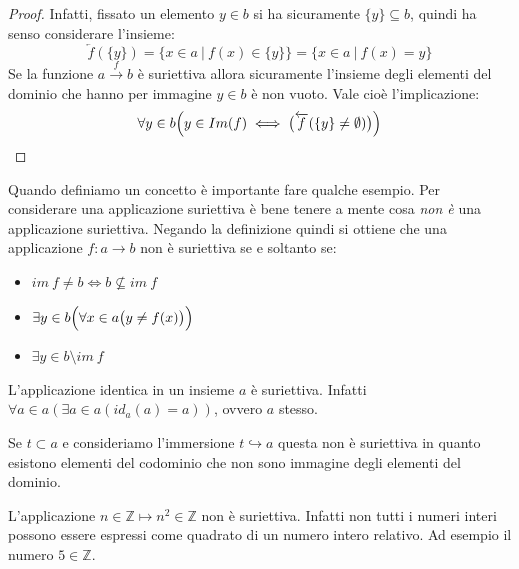 \begin{proof}
	Infatti, fissato un elemento $y \in b$ si ha sicuramente $\{y\} \subseteq b$, quindi ha senso considerare l'insieme:
	\begin{displaymath}
		\overleftarrow{f}(\{y\}) =\{x \in a \ | \ f(x) \in \{y\} \} = \{x \in a \ | \ f(x)=y\}
	\end{displaymath}
	Se la funzione $a \stackrel{f}{\longrightarrow}b$ è suriettiva allora sicuramente l'insieme degli elementi del dominio che hanno per immagine $y \in b$ è non vuoto. Vale cioè l'implicazione:
	\begin{displaymath}
		\forall y \in b \Bigl( y \in Im(f) \iff \bigl( \overleftarrow{f}(\{y\}\neq \emptyset)\bigr)\Bigr)
	\end{displaymath}
\end{proof}

\begin{osservation}
	Quando definiamo un concetto è importante fare qualche esempio. Per considerare una applicazione suriettiva è bene tenere a mente cosa \textit{non è} una applicazione suriettiva. Negando la definizione quindi si ottiene che una applicazione $f:a \longrightarrow b$ non è suriettiva se e soltanto se:
	\begin{itemize}
		\item $im \ f \neq b \iff b \nsubseteq im \ f$
		\item $\exists y \in b \Bigl( \forall x \in a \bigl(y \neq f(x) \bigr)\Bigr)$
		\item $\exists y \in b \setminus im \ f$
	\end{itemize}
\end{osservation}

\begin{example}
	L'applicazione identica in un insieme $a$ è suriettiva. Infatti $\forall a \in a (\exists a \in a (id_{a}(a)=a))$, ovvero $a$ stesso.
\end{example}

\begin{example}
	Se $t \subset a$ e consideriamo l'immersione $t \hookrightarrow a$ questa non è suriettiva in quanto esistono elementi del codominio che non sono immagine degli elementi del dominio.
\end{example}

\begin{example}
	L'applicazione $n \in \mathbb{Z} \mapsto n^{2} \in \mathbb{Z}$ non è suriettiva. Infatti non tutti i numeri interi possono essere espressi come quadrato di un numero intero relativo. Ad esempio il numero $5 \in \mathbb{Z}$.
\end{example}

